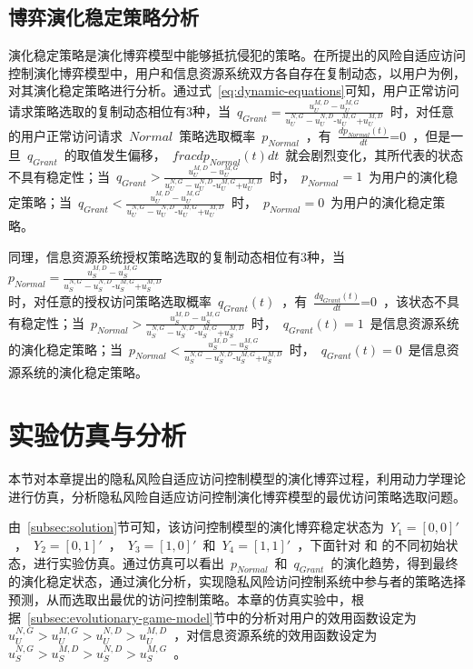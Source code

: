 \subsection{博弈演化稳定策略分析}
演化稳定策略是演化博弈模型中能够抵抗侵犯的策略。在所提出的风险自适应访问控制演化博弈模型中，用户和信息资源系统双方各自存在复制动态，以用户为例，对其演化稳定策略进行分析。通过式~\ref{eq:dynamic-equations}可知，用户正常访问请求策略选取的复制动态相位有3种，当~${{q}_{Grant}}=\frac{u_{U}^{M,D}-u_{U}^{M,G}}{u_{U}^{N,G}-u_{U}^{N,D}\text{-}u_{U}^{M,G}\text{+}u_{U}^{M,D}}$~时，对任意的用户正常访问请求~$Normal$~策略选取概率~$p_{Normal}$~，有~$\frac{d{{p}_{Normal}}(t)}{dt}\text{=0}$~，但是一旦~$q_{Grant}$~的取值发生偏移，~$frac{d{{p}_{Normal}}(t)}{dt}$~就会剧烈变化，其所代表的状态不具有稳定性；当~${{q}_{Grant}}>\frac{u_{U}^{M,D}-u_{U}^{M,G}}{u_{U}^{N,G}-u_{U}^{N,D}\text{-}u_{U}^{M,G}\text{+}u_{U}^{M,D}}$~时，~$p_{Normal}= 1$~为用户的演化稳定策略；当~${{q}_{Grant}}<\frac{u_{U}^{M,D}-u_{U}^{M,G}}{u_{U}^{N,G}-u_{U}^{N,D}\text{-}u_{U}^{M,G}\text{+}u_{U}^{M,D}}$~时，~$p_{Normal}=0$~为用户的演化稳定策略。

 同理，信息资源系统授权策略选取的复制动态相位有3种，当~${{p}_{Normal}}=\frac{u_{S}^{M,D}-u_{S}^{M,G}}{u_{S}^{N,G}-u_{S}^{N,D}\text{-}u_{S}^{M,G}\text{+}u_{S}^{M,D}}$\\时，对任意的授权访问策略选取概率~$q_{Grant}(t)$~，有~$\frac{d{{q}_{Grant}}(t)}{dt}\text{=0}$~，该状态不具有稳定性；当~${{p}_{Normal}}>\frac{u_{S}^{M,D}-u_{S}^{M,G}}{u_{S}^{N,G}-u_{S}^{N,D}\text{-}u_{S}^{M,G}\text{+}u_{S}^{M,D}}$~时，~$q_{Grant}(t)=1$~是信息资源系统的演化稳定策略；当~${{p}_{Normal}}<\frac{u_{S}^{M,D}-u_{S}^{M,G}}{u_{S}^{N,G}-u_{S}^{N,D}\text{-}u_{S}^{M,G}\text{+}u_{S}^{M,D}}$~时，~$q_{Grant}(t)=0$~是信息资源系统的演化稳定策略。
 
 
 \section{实验仿真与分析}
本节对本章提出的隐私风险自适应访问控制模型的演化博弈过程，利用动力学理论进行仿真，分析隐私风险自适应访问控制演化博弈模型的最优访问策略选取问题。

 由~\ref{subsec:solution}节可知，该访问控制模型的演化博弈稳定状态为~${{Y}_{1}}=[0,0]'$~，~${{Y}_{2}}=[0,1]'$~，~${{Y}_{3}}=[1,0]'$~和~${{Y}_{4}}=[1,1]'$~，下面针对 和 的不同初始状态，进行实验仿真。通过仿真可以看出~$p_{Normal}$~和~$q_{Grant}$~的演化趋势，得到最终的演化稳定状态，通过演化分析，实现隐私风险访问控制系统中参与者的策略选择预测，从而选取出最优的访问控制策略。本章的仿真实验中，根据~\ref{subsec:evolutionary-game-model}节中的分析对用户的效用函数设定为~$u_{U}^{N,G}>u_{U}^{M,G}>u_{U}^{N,D}>u_{U}^{M,D}$~，对信息资源系统的效用函数设定为~$u_{S}^{N,G}>u_{S}^{M,D}>u_{S}^{N,D}>u_{S}^{M,G}$~。

